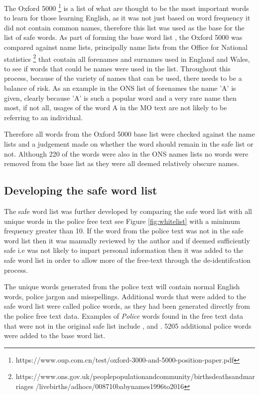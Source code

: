 The Oxford 5000 \footnote{https://www.oup.com.cn/test/oxford-3000-and-5000-position-paper.pdf} is a list of what are thought to be the most important words to learn for those learning English, as it was not just based on word frequency it did not contain common names, therefore this list  was used as the base for the list of safe words. As part of forming the base word list , the Oxford 5000 was compared against name lists, principally name lists from the Office for National statistics \footnote{https://www.ons.gov.uk/peoplepopulationandcommunity/birthsdeathsandmarriages /livebirths/adhocs/008710babynames1996to2016} that contain all forenames and surnames used in England and Wales, to see if words that could be names were used in the list. Throughout this process, because of the variety of names that can be used, there needs to be a balance of risk. As an example in the ONS list of forenames the name 'A' is given, clearly because 'A' is such a popular word and a very rare name then most, if not all, usages of the word A in the MO text are not likely to be referring to an individual. 

Therefore all words from the Oxford 5000 base list were checked against the name lists and a judgement made on whether the word should remain in the safe list or not. Although 220 of the words were also in the ONS names lists no words were removed from the base list as they were all deemed relatively obscure names.


\subsection{Developing the safe word list} The safe word list was further developed by comparing the safe word list with all unique words in the police free text see Figure \ref{fig:whitelist} with a minimum frequency greater than 10. If the word from the police text was not in the safe word list then it was manually reviewed by the author and if deemed sufficiently safe i.e was not likely to impart personal information then it was added to the safe word list in order to allow more of the free-text through the de-identifcation process.

The unique words generated from the police text will contain normal English words, police jargon and misspellings. Additional words that were added to the safe word list were called police words, as they had been generated directly from the police free text data. Examples of \emph{Police} words found in the free text data that were not in the original safe list include ,  and . 5205 additional police words were added to the base word list.

